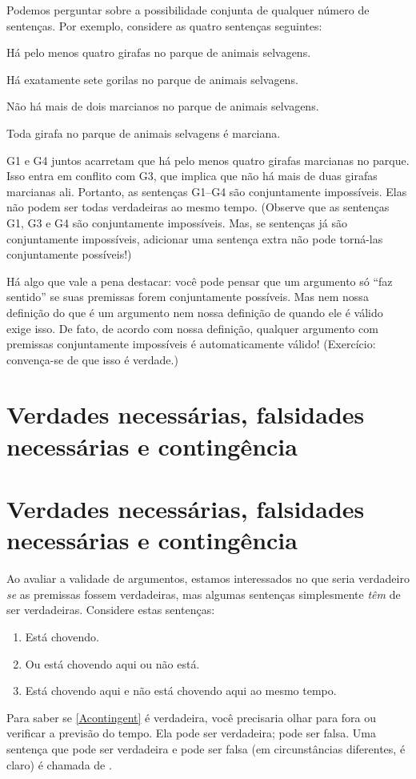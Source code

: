 Podemos perguntar sobre a possibilidade conjunta de qualquer número de sentenças. Por exemplo, considere as quatro sentenças seguintes:
	\begin{compactlist}	
		\item[G1.] \label{MartianGiraffes} Há pelo menos quatro girafas no parque de animais selvagens.
		\item[G2.] Há exatamente sete gorilas no parque de animais selvagens.
		\item[G3.] Não há mais de dois marcianos no parque de animais selvagens.
		\item[G4.] Toda girafa no parque de animais selvagens é marciana.
	\end{compactlist}
G1 e G4 juntos acarretam que há pelo menos quatro girafas
marcianas no parque. Isso entra em conflito com G3, que implica que não
há mais de duas girafas marcianas ali. Portanto, as sentenças G1--G4
são conjuntamente impossíveis. Elas não podem ser todas verdadeiras ao
mesmo tempo. (Observe que as sentenças G1, G3 e G4 são conjuntamente
impossíveis. Mas, se sentenças já são conjuntamente impossíveis,
adicionar uma sentença extra não pode torná-las conjuntamente
possíveis!)

Há algo que vale a pena destacar: você pode pensar que um argumento só \textquotedblleft faz sentido\textquotedblright{} se suas premissas forem conjuntamente possíveis. Mas nem nossa definição do que é um argumento nem nossa definição de quando ele é válido exige isso. De fato, de acordo com nossa definição, qualquer argumento com premissas conjuntamente impossíveis é automaticamente válido! (Exercício: convença-se de que isso é verdade.)

\ifHTMLtarget
\section{Verdades necessárias, falsidades necessárias e contingência}
\else
\section[Verdades e falsidades necessárias]{Verdades necessárias, falsidades necessárias e contingência}
\fi

Ao avaliar a validade de argumentos, estamos interessados no que seria verdadeiro \emph{se} as premissas fossem verdadeiras, mas algumas sentenças simplesmente \emph{têm} de ser verdadeiras. Considere estas sentenças:
	\begin{enumerate}
		\item\label{Acontingent} Está chovendo.
		\item\label{Atautology} Ou está chovendo aqui ou não está.
		\item\label{Acontradiction} Está chovendo aqui e não está chovendo aqui ao mesmo tempo.
	\end{enumerate}
Para saber se \cref*{Acontingent} é verdadeira, você precisaria olhar para fora ou verificar a previsão do tempo. Ela pode ser verdadeira; pode ser falsa. Uma sentença que pode ser verdadeira e pode ser falsa (em circunstâncias diferentes, é claro) é chamada de .

